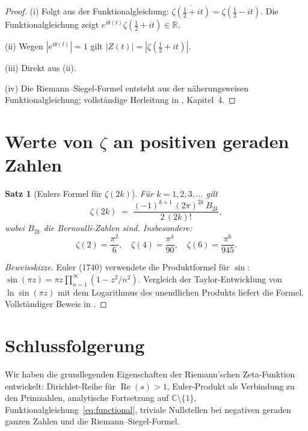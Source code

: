 \documentclass[12pt,a4paper]{amsart}
\newtheorem{theorem}{Satz}[section]
\theoremstyle{definition}
\newcommand{\R}{\mathbb{R}}
\newcommand{\C}{\mathbb{C}}
\DeclareMathOperator{\Re}{Re}
\begin{document}
\begin{proof}
(i) Folgt aus der Funktionalgleichung:
$\overline{\zeta(\tfrac{1}{2}+it)} = \zeta(\tfrac{1}{2}-it)$.
Die Funktionalgleichung zeigt $e^{i\theta(t)}\zeta(\tfrac{1}{2}+it) \in \R$.

(ii) Wegen $|e^{i\theta(t)}| = 1$ gilt $|Z(t)| = |\zeta(\tfrac{1}{2}+it)|$.

(iii) Direkt aus (ii).

(iv) Die Riemann--Siegel-Formel entsteht aus der n\"aherungsweisen
Funktionalgleichung; vollst\"andige Herleitung in \cite{Titchmarsh1986},
Kapitel~4.
\end{proof}

\section{Werte von \texorpdfstring{$\zeta$}{zeta} an positiven geraden Zahlen}

\begin{theorem}[Eulers Formel f\"ur $\zeta(2k)$]
\label{thm:euler_values}
F\"ur $k = 1, 2, 3, \ldots$ gilt
\[
  \zeta(2k) \;=\; \frac{(-1)^{k+1}\,(2\pi)^{2k}\,B_{2k}}{2\,(2k)!},
\]
wobei $B_{2k}$ die Bernoulli-Zahlen sind. Insbesondere:
\[
  \zeta(2) = \frac{\pi^2}{6}, \quad
  \zeta(4) = \frac{\pi^4}{90}, \quad
  \zeta(6) = \frac{\pi^6}{945}.
\]
\end{theorem}

\begin{proof}[Beweisskizze]
Euler (1740) verwendete die Produktformel f\"ur $\sin$:
$\sin(\pi z) = \pi z \prod_{n=1}^{\infty}(1 - z^2/n^2)$.
Vergleich der Taylor-Entwicklung von $\ln\sin(\pi z)$ mit dem Logarithmus
des unendlichen Produkts liefert die Formel.
Vollst\"andiger Beweis in \cite{Apostol1976}.
\end{proof}

\section{Schlussfolgerung}

Wir haben die grundlegenden Eigenschaften der Riemann'schen Zeta-Funktion
entwickelt: Dirichlet-Reihe f\"ur $\Re(s)>1$, Euler-Produkt als Verbindung
zu den Primzahlen, analytische Fortsetzung auf $\C\setminus\{1\}$,
Funktionalgleichung~\eqref{eq:functional}, triviale Nullstellen bei negativen
geraden ganzen Zahlen und die Riemann--Siegel-Formel.
\end{document}
